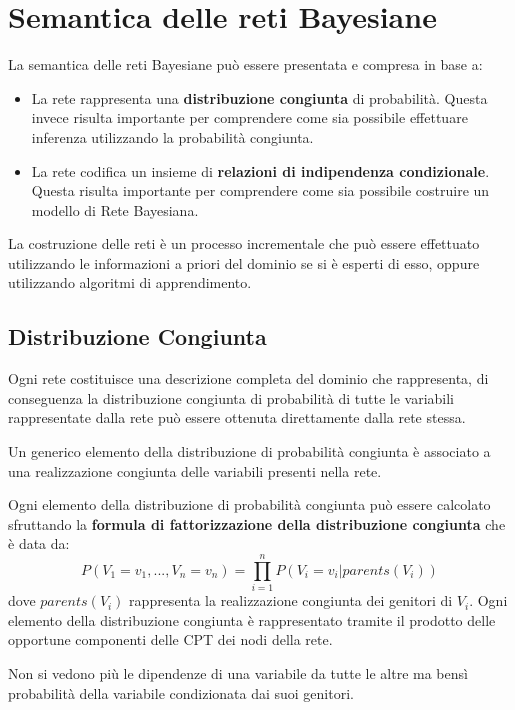 \section{Semantica delle reti Bayesiane}
La semantica delle reti Bayesiane può essere presentata e compresa in base a:
\begin{itemize}
    \item La rete rappresenta una \textbf{distribuzione congiunta} di probabilità.
          Questa invece risulta importante per comprendere come sia possibile
          effettuare inferenza utilizzando la probabilità congiunta.
    \item La rete codifica un insieme di \textbf{relazioni di indipendenza condizionale}.
          Questa
          risulta importante per comprendere come sia possibile costruire un
          modello di Rete Bayesiana.
\end{itemize}

La costruzione delle reti è un processo incrementale che può essere effettuato
utilizzando le informazioni a priori del dominio se si è esperti di esso, oppure
utilizzando algoritmi di apprendimento.

\subsection{Distribuzione Congiunta}
Ogni rete costituisce una descrizione completa del dominio che rappresenta, di
conseguenza la distribuzione congiunta di probabilità di tutte le variabili
rappresentate dalla rete può essere ottenuta direttamente dalla rete stessa.

Un generico elemento della distribuzione di probabilità congiunta è associato a
una realizzazione congiunta delle variabili presenti nella rete.

Ogni elemento della distribuzione di probabilità congiunta può essere calcolato
sfruttando la \textbf{formula di fattorizzazione della distribuzione congiunta}
che è data da:
\begin{equation}
    P(V_1 = v_1,...,V_n = v_n) = \prod_{i=1}^{n} P(V_i=v_i|parents(V_i))
\end{equation}
dove $parents(V_i)$ rappresenta la realizzazione congiunta dei genitori di $V_i$.
Ogni elemento della distribuzione congiunta è rappresentato tramite il prodotto
delle opportune componenti delle CPT dei nodi della rete.

\begin{nota}
    Non si vedono più le dipendenze di una variabile da tutte le altre ma bensì
    probabilità della variabile condizionata dai suoi genitori.
\end{nota}

